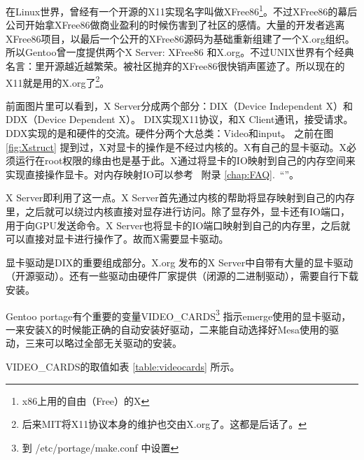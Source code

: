 \documentclass[amstex,twoside]{ctexbook}
\newcommand{\faqref}[1]{~附录 \ref{chap:FAQ}.\nameref{chap:FAQ}~“\nameref{#1}”}
\begin{document}

在Linux世界，曾经有一个开源的X11实现名字叫做XFree86\footnote{x86上用的自由（Free）的X}。不过XFree86的幕后公司开始拿XFree86做商业盈利的时候伤害到了社区的感情。大量的开发者逃离XFree86项目，以最后一个公开的XFree86源码为基础重新组建了一个X.org组织。所以Gentoo曾一度提供两个X Server: XFree86 和X.org。不过UNIX世界有个经典名言：里开源越近越繁荣。被社区抛弃的XFree86很快销声匿迹了。所以现在的X11就是用的X.org了\footnote{后来MIT将X11协议本身的维护也交由X.org了。这都是后话了。}。


前面图片里可以看到，X Server分成两个部分：DIX（Device Independent X）和DDX（Device Dependent X）。 DIX实现X11协议，和X Client通讯，接受请求。
DDX实现的是和硬件的交流。硬件分两个大总类：Video和input。
之前在图 \ref{fig:Xstruct} 提到过，X对显卡的操作是不经过内核的。X有自己的显卡驱动。X必须运行在root权限的缘由也是基于此。X通过将显卡的IO映射到自己的内存空间来实现直接操作显卡。对内存映射IO可以参考 \faqref{FAQ:MMIO}。

X Server即利用了这一点。X Server首先通过内核的帮助将显存映射到自己的内存里，之后就可以绕过内核直接对显存进行访问。除了显存外，显卡还有IO端口，用于向GPU发送命令。X Server也将显卡的IO端口映射到自己的内存里，之后就可以直接对显卡进行操作了。故而X需要显卡驱动。

显卡驱动是DIX的重要组成部分。X.org 发布的X Server中自带有大量的显卡驱动（开源驱动）。还有一些驱动由硬件厂家提供（闭源的二进制驱动），需要自行下载安装。

Gentoo portage有个重要的变量VIDEO\_CARDS\footnote{到 /etc/portage/make.conf 中设置} 指示emerge使用的显卡驱动，一来安装X的时候能正确的自动安装好驱动，二来能自动选择好Mesa使用的驱动，三来可以略过全部无关驱动的安装。

VIDEO\_CARDS的取值如表 \ref{table:videocards} 所示。
\end{document}

